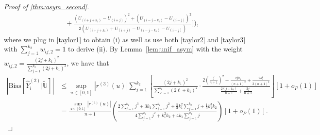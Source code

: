 \documentclass{uwstat572}
\theoremstyle{definition}
\renewcommand{\hat}{\widehat}
\renewcommand{\tilde}{\widetilde}
\theoremstyle{theorem}
\begin{document}
\begin{proof}[Proof of \autoref{thm:asym_second}]
\begin{align*}
&\quad + \frac{\left(U_{(i+j+k_1)} -U_{(i+j)}\right)^2 + \left(U_{(i-j-k_1)} -U_{(i-j)}\right)^2}{3\left(U_{(i+j+k_1)} + U_{(i+j)} - U_{(i-j-k_1)} -U_{(i-j)}\right)}\Bigg]\Bigg),
\end{align*}
where we plug in \eqref{taylor1} to obtain (i) as well as use both \eqref{taylor2} and \eqref{taylor3} with $\sum_{j=1}^{k_2} w_{ij,2}=1$ to derive (ii). By Lemma~\ref{lem:unif_asym} with the weight $w_{ij,2}=\frac{(2j+k_1)^2}{\sum_{j=1}^{k_2} (2j+k_1)^2}$, we have that
\begin{align*}
\left|\mathrm{Bias}\left[\hat{Y}_i^{(2)}\big| \tilde{\mathbb{U}}\right]\right| &\leq \sup_{u\in [0,1]}\left|r^{(3)}(u) \right| \sum_{j=1}^{k_2} \left[\frac{(2j+k_1)^2}{\sum_{\ell=1}^{k_2} (2\ell+k_1)^2} \cdot \frac{2\left(\frac{j}{n+1}\right)^2 + \frac{2jk_1}{(n+1)^2} + \frac{2k_1^2}{3(n+1)^2}}{\frac{2(j+k_1)}{n+1} + \frac{2j}{n+1}} \right] \left[1+o_P(1)\right]\\
&= \frac{\sup_{u\in [0,1]}\left|r^{(3)}(u)\right|}{n+1}  \left(\frac{2\sum_{j=1}^{k_2} j^3 + 3k_1 \sum_{j=1}^{k_2} j^2 + \frac{5}{3} k_1^2 \sum_{j=1}^{k_2}j + \frac{1}{3} k_1^3k_2}{4 \sum_{j=1}^{k_2}j^2 + k_1^2k_2 + 4k_1\sum_{j=1}^{k_2} j} \right)\left[1+o_P(1)\right].
\end{align*}


\end{proof}
\end{document}
